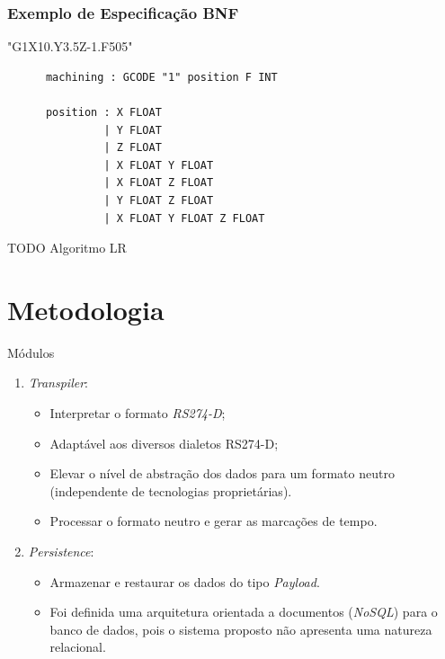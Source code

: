 \documentclass[aspectratio=169]{beamer}
\begin{document}
{\begin{frame}
\end{frame}


\begin{frame}[fragile]
  \frametitle{Exemplo de Especificação BNF}
  \begin{example}
   "G1X10.Y3.5Z-1.F505"
    \begin{lstlisting}
      machining : GCODE "1" position F INT

      position : X FLOAT
               | Y FLOAT
               | Z FLOAT
               | X FLOAT Y FLOAT
               | X FLOAT Z FLOAT
               | Y FLOAT Z FLOAT
               | X FLOAT Y FLOAT Z FLOAT
    \end{lstlisting}
  \end{example}  
\end{frame}


TODO  
  Algoritmo LR



\section{Metodologia}

\begin{frame}{Módulos}
  \begin{enumerate}
    \item {
      \emph{Transpiler}: 
      \begin{itemize}
        \item Interpretar o formato \emph{RS274-D};
        \item Adaptável aos diversos dialetos RS274-D;
        \item Elevar o nível de abstração dos dados para um formato 
              neutro (independente de tecnologias proprietárias).
        \item Processar o formato neutro e gerar as marcações de tempo.
      \end{itemize}
    }

    \item {
      \emph{Persistence}:
      \begin{itemize}
        \item Armazenar e restaurar os dados do tipo \emph{Payload}.
        \item Foi definida uma arquitetura orientada a documentos 
              (\emph{NoSQL}) para o banco de dados, pois o sistema 
              proposto não apresenta uma natureza relacional.
      \end{itemize}
    }


\end{enumerate}
\end{frame}}
\end{document}
